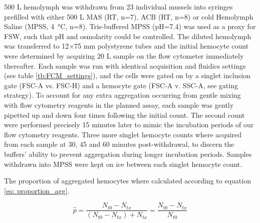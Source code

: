 500 \micro L hemolymph was withdrawn from 23 individual mussels into syringes prefilled with either 500 \micro L MAS (RT, n=7), ACB (RT, n=8) or cold Hemolymph Saline (MPSS, \SI{4}{\celsius}, n=8). Tris-buffered MPSS (pH=7.4) was used as a proxy for FSW, such that pH and osmolarity could be controlled. The diluted hemolymph was transferred to 12$\times$75 mm polystyrene tubes and the initial hemocyte count were determined by acquiring 20 \micro L sample on the flow cytometer immediately thereafter. Each sample was run with identical acquisition and fluidics settings (see table \ref{tb:FCM_settings}), and the cells were gated on by a singlet inclusion gate (FSC-A vs. FSC-H) and a hemocyte gate (FSC-A v. SSC-A, see gating strategy). To account for any extra aggregation occurring from gentle mixing with flow cytometry reagents in the planned assay, each sample was gently pipetted up and down four times following the initial count. The second count were performed precisely 15 minutes later to mimic the incubation periods of our flow cytometry reagents. Three more singlet hemocyte counts where acquired from each sample at 30, 45 and 60 minutes post-withdrawal, to discern the buffers' ability to prevent aggregation during longer incubation periods. Samples withdrawn into MPSS were kept on ice between each singlet hemocyte count.

The proportion of aggregated hemocytes where calculated according to equation \ref{eq: proportion_agg}.

\begin{equation}
    \label{eq: proportion_agg}
    \hat{p} = \dfrac{N_{t0} - N_{tx}}{(N_{t0} - N_{tx}) + N_{tx}} = \dfrac{N_{t0} - N_{tx}}{N_{t0}}
\end{equation}

